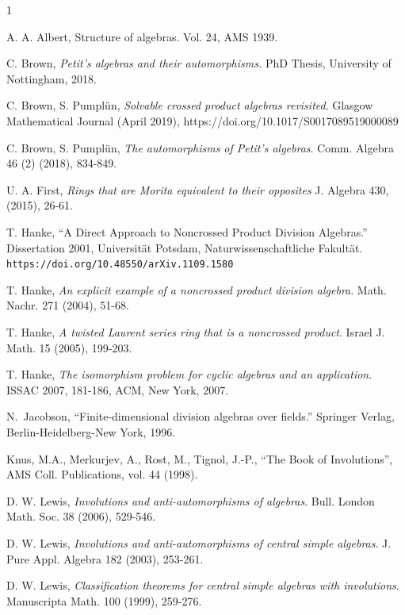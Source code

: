 \documentclass{amsart}
\theoremstyle{plain}
\theoremstyle{definition}
\numberwithin{equation}{section}
\numberwithin{figure}{section}
\begin{document}
\begin{thebibliography}{1}

 A. A. Albert, Structure of algebras. Vol. 24, AMS 1939.

 C. Brown, \emph{Petit's algebras and their  automorphisms.} PhD Thesis, University of Nottingham, 2018.

 C. Brown,  S. Pumpl\"un, \emph{Solvable crossed product algebras revisited}.
 Glasgow Mathematical Journal (April 2019),
 https://doi.org/10.1017/S0017089519000089

   C. Brown,  S. Pumpl\"un, \emph{The automorphisms of Petit's algebras}.
  Comm. Algebra  46 (2) (2018), 834-849.

  U. A. First,
\emph{Rings that are Morita equivalent to their opposites}
J. Algebra 430, (2015), 26-61.

 T. Hanke, ``A Direct Approach to Noncrossed Product Division Algebras.'' Dissertation 2001, Universit\"at Potsdam, Naturwissenschaftliche Fakult\"at.
\verb#https://doi.org/10.48550/arXiv.1109.1580#

  T. Hanke, \emph{An explicit example of a noncrossed product division algebra}.
Math. Nachr. 271 (2004), 51-68.


  T. Hanke, \emph{A twisted Laurent series ring that is a noncrossed product}.
   Israel J. Math. 15  (2005), 199-203.

  T. Hanke, \emph{The isomorphism problem for cyclic algebras and an  application}. ISSAC 2007, 181-186, ACM, New York, 2007.


 N.~Jacobson,
``Finite-dimensional division algebras over fields.'' Springer Verlag,
Berlin-Heidelberg-New York, 1996.

 Knus, M.A., Merkurjev, A., Rost, M., Tignol, J.-P.,
``The Book of Involutions'', AMS Coll. Publications, vol. 44 (1998).

 D. W. Lewis, \emph{Involutions and anti-automorphisms of algebras}. Bull. London Math. Soc. 38 (2006), 529-546. 

 D. W. Lewis, \emph{Involutions and anti-automorphisms of central simple algebras}. J. Pure Appl. Algebra 182 (2003), 253-261.

 D. W. Lewis, \emph{Classification theorems for central simple algebras with involutions}. Manuscripta Math. 100 (1999), 259-276.


\end{thebibliography}
\end{document}
